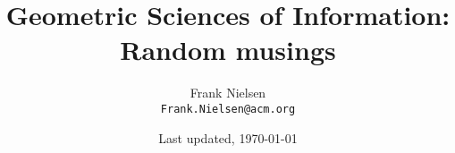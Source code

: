 \documentclass{beamer}
\begin{document}
\title{Geometric Sciences of Information:\\ Random musings}
 
\date{Last updated, \today}

\author{Frank Nielsen\\ {\tt Frank.Nielsen@acm.org}}
 
\begin{frame}
\titlepage
\end{frame}

\begin{comment}
Updated https://arxiv.org/abs/2204.10952
- $f$-divergences between densities of a multivariate location family amount to an increasing function of their Mahalanobis distance, multivariate $f$-div = univariate $f$-div (=> fast Monte Carlo estimations)
- $f$-div between densities of a multivariate scale family is a spectral matrix divergence
\end{comment}
\end{document}
